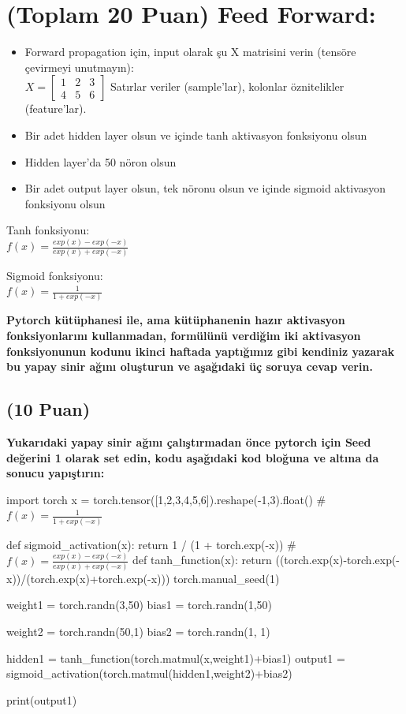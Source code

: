 \documentclass[11pt]{article}
\begin{document}
\section{(Toplam 20 Puan) Feed Forward:}
 
\begin{itemize}
    \item Forward propagation için, input olarak şu X matrisini verin (tensöre çevirmeyi unutmayın):\\
    $X = \begin{bmatrix}
        1 & 2 & 3\\
        4 & 5 & 6
        \end{bmatrix}$
    Satırlar veriler (sample'lar), kolonlar öznitelikler (feature'lar).
    \item Bir adet hidden layer olsun ve içinde tanh aktivasyon fonksiyonu olsun
    \item Hidden layer'da 50 nöron olsun
    \item Bir adet output layer olsun, tek nöronu olsun ve içinde sigmoid aktivasyon fonksiyonu olsun
\end{itemize}

Tanh fonksiyonu:\\
$f(x) = \frac{exp(x) - exp(-x)}{exp(x) + exp(-x)}$
\vspace{.2in}

Sigmoid fonksiyonu:\\
$f(x) = \frac{1}{1 + exp(-x)}$

\vspace{.2in}
 \textbf{Pytorch kütüphanesi ile, ama kütüphanenin hazır aktivasyon fonksiyonlarını kullanmadan, formülünü verdiğim iki aktivasyon fonksiyonunun kodunu ikinci haftada yaptığımız gibi kendiniz yazarak bu yapay sinir ağını oluşturun ve aşağıdaki üç soruya cevap verin.}
 
\subsection{(10 Puan)} \textbf{Yukarıdaki yapay sinir ağını çalıştırmadan önce pytorch için Seed değerini 1 olarak set edin, kodu aşağıdaki kod bloğuna ve altına da sonucu yapıştırın:}

\begin{python}
import torch
x = torch.tensor([1,2,3,4,5,6]).reshape(-1,3).float()
# $f(x) = \frac{1}{1 + exp(-x)}$

def sigmoid_activation(x):
    return 1 / (1 + torch.exp(-x))
# $f(x) = \frac{exp(x) - exp(-x)}{exp(x) + exp(-x)}$
def tanh_function(x):
    return ((torch.exp(x)-torch.exp(-x))/(torch.exp(x)+torch.exp(-x)))
torch.manual_seed(1)

weight1 = torch.randn(3,50) 
bias1 = torch.randn(1,50) 

weight2 = torch.randn(50,1)
bias2 = torch.randn(1, 1)

hidden1 = tanh_function(torch.matmul(x,weight1)+bias1)
output1 = sigmoid_activation(torch.matmul(hidden1,weight2)+bias2)

print(output1)
\end{python}
\end{document}
